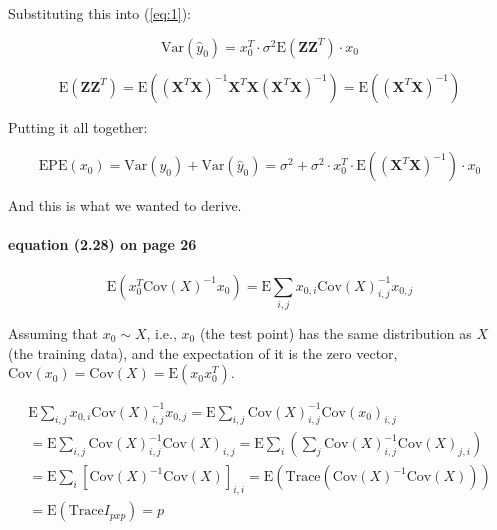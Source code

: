 \documentclass{article}
\begin{document}
Substituting this into (\ref{eq:1}):

\begin{equation}
    \text{Var}(\hat{y}_0) = x_0^T \cdot \sigma^2 \text{E} (\textbf{Z} \textbf{Z}^T) \cdot x_0
\end{equation}

\begin{equation}
    \text{E}(\textbf{Z} \textbf{Z}^T) = \text{E} \left( (\textbf{X}^T \textbf{X})^{-1} \textbf{X}^T \textbf{X} (\textbf{X}^T \textbf{X})^{-1} \right) = \text{E} \left( (\textbf{X}^T \textbf{X})^{-1} \right)
\end{equation}

Putting it all together:

\begin{equation}
    \text{EPE}(x_0) = \text{Var} (y_0) + \text{Var} (\hat{y}_0) = \sigma^2 + \sigma^2 \cdot x_0^T \cdot \text{E} \left( (\textbf{X}^T \textbf{X})^{-1} \right) \cdot x_0
\end{equation}

And this is what we wanted to derive.

\paragraph{equation (2.28) on page 26}

\begin{equation}
    \text{E} \left( x^T_0 \text{Cov}(X)^{-1}x_0 \right) = \text{E} \sum_{i,j} x_{0,i} \text{Cov}(X)^{-1}_{i,j} x_{0,j}
\end{equation}

Assuming that $x_0 \sim X$, i.e., $x_0$ (the test point) has the same distribution as $X$ (the training data), and the expectation of it is the zero vector, $\text{Cov}(x_0) = \text{Cov}(X) = \text{E} (x_0 x^T_0)$.

\begin{equation}
  \begin{split}
    \text{E} \sum_{i,j} x_{0,i} \text{Cov}(X)^{-1}_{i,j} x_{0,j} = \text{E} \sum_{i,j} \text{Cov}(X)^{-1}_{i,j} \text{Cov}(x_0)_{i,j}\\
    = \text{E} \sum_{i,j} \text{Cov}(X)^{-1}_{i,j} \text{Cov}(X)_{i,j} = \text{E} \sum_{i} \left( \sum_{j} \text{Cov}(X)^{-1}_{i,j} \text{Cov}(X)_{j,i} \right)\\
    = \text{E} \sum_{i} [\text{Cov}(X)^{-1} \text{Cov}(X)]_{i,i} = \text{E} \left( \text{Trace} (\text{Cov}(X)^{-1} \text{Cov}(X)) \right) \\
    = \text{E} \left( \text{Trace} I_{pxp} \right) = p
  \end{split}
\end{equation}
\end{document}
